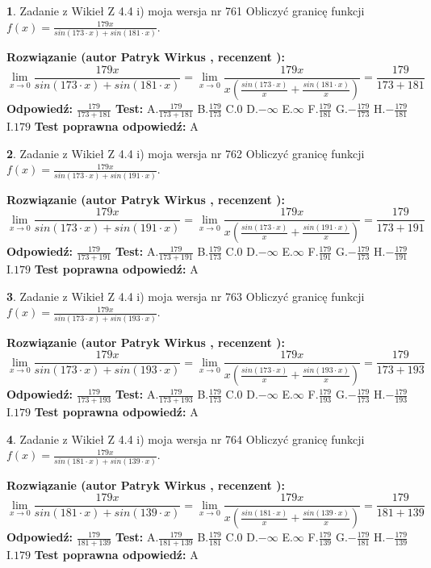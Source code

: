 \documentclass[12pt, a4paper]{article}
\theoremstyle{definition} %
\newtheorem{zad}{}
\newcommand{\zadStart}[1]{\begin{zad}#1\newline}
\newcommand{\zadStop}{\end{zad}}
\newcommand{\rozwStart}[2]{\noindent \textbf{Rozwiązanie (autor #1 , recenzent #2): }\newline}
\newcommand{\rozwStop}{\newline}
\newcommand{\odpStart}{\noindent \textbf{Odpowiedź:}\newline}
\newcommand{\odpStop}{\newline}
\newcommand{\testStart}{\noindent \textbf{Test:}\newline}
\newcommand{\testStop}{\newline}
\newcommand{\kluczStart}{\noindent \textbf{Test poprawna odpowiedź:}\newline}
\newcommand{\kluczStop}{\newline}
\begin{document}
\zadStart{Zadanie z Wikieł Z 4.4 i) moja wersja nr 761}
Obliczyć granicę funkcji $f(x)=\frac{179x}{sin(173\cdot x) +sin(181\cdot x)}$.
\zadStop
\rozwStart{Patryk Wirkus}{}
$$\lim\limits_{x\to 0}\frac{179x}{sin(173\cdot x) +sin(181\cdot x)}=\lim\limits_{x\to 0}\frac{179x}{x(\frac{sin(173\cdot x)}{x}+\frac{sin(181\cdot x)}{x})}=\frac{179}{173+181}$$
\rozwStop
\odpStart
$\frac{179}{173+181}$
\odpStop
\testStart
A.$\frac{179}{173+181}$
B.$\frac{179}{173}$
C.$0$
D.$-\infty$
E.$\infty$
F.$\frac{179}{181}$
G.$-\frac{179}{173}$
H.$-\frac{179}{181}$
I.$179$
\testStop
\kluczStart
A
\kluczStop



\zadStart{Zadanie z Wikieł Z 4.4 i) moja wersja nr 762}
Obliczyć granicę funkcji $f(x)=\frac{179x}{sin(173\cdot x) +sin(191\cdot x)}$.
\zadStop
\rozwStart{Patryk Wirkus}{}
$$\lim\limits_{x\to 0}\frac{179x}{sin(173\cdot x) +sin(191\cdot x)}=\lim\limits_{x\to 0}\frac{179x}{x(\frac{sin(173\cdot x)}{x}+\frac{sin(191\cdot x)}{x})}=\frac{179}{173+191}$$
\rozwStop
\odpStart
$\frac{179}{173+191}$
\odpStop
\testStart
A.$\frac{179}{173+191}$
B.$\frac{179}{173}$
C.$0$
D.$-\infty$
E.$\infty$
F.$\frac{179}{191}$
G.$-\frac{179}{173}$
H.$-\frac{179}{191}$
I.$179$
\testStop
\kluczStart
A
\kluczStop



\zadStart{Zadanie z Wikieł Z 4.4 i) moja wersja nr 763}
Obliczyć granicę funkcji $f(x)=\frac{179x}{sin(173\cdot x) +sin(193\cdot x)}$.
\zadStop
\rozwStart{Patryk Wirkus}{}
$$\lim\limits_{x\to 0}\frac{179x}{sin(173\cdot x) +sin(193\cdot x)}=\lim\limits_{x\to 0}\frac{179x}{x(\frac{sin(173\cdot x)}{x}+\frac{sin(193\cdot x)}{x})}=\frac{179}{173+193}$$
\rozwStop
\odpStart
$\frac{179}{173+193}$
\odpStop
\testStart
A.$\frac{179}{173+193}$
B.$\frac{179}{173}$
C.$0$
D.$-\infty$
E.$\infty$
F.$\frac{179}{193}$
G.$-\frac{179}{173}$
H.$-\frac{179}{193}$
I.$179$
\testStop
\kluczStart
A
\kluczStop



\zadStart{Zadanie z Wikieł Z 4.4 i) moja wersja nr 764}
Obliczyć granicę funkcji $f(x)=\frac{179x}{sin(181\cdot x) +sin(139\cdot x)}$.
\zadStop
\rozwStart{Patryk Wirkus}{}
$$\lim\limits_{x\to 0}\frac{179x}{sin(181\cdot x) +sin(139\cdot x)}=\lim\limits_{x\to 0}\frac{179x}{x(\frac{sin(181\cdot x)}{x}+\frac{sin(139\cdot x)}{x})}=\frac{179}{181+139}$$
\rozwStop
\odpStart
$\frac{179}{181+139}$
\odpStop
\testStart
A.$\frac{179}{181+139}$
B.$\frac{179}{181}$
C.$0$
D.$-\infty$
E.$\infty$
F.$\frac{179}{139}$
G.$-\frac{179}{181}$
H.$-\frac{179}{139}$
I.$179$
\testStop
\kluczStart
A
\kluczStop
\end{document}
